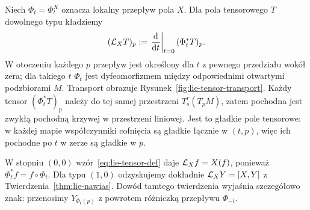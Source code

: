 \begin{definicja}
\label{def:lie-tensor}
Niech $\Phi_t=\Phi_t^X$ oznacza lokalny przepływ pola $X$.
Dla pola tensorowego $T$ dowolnego typu kładziemy
\begin{equation}\label{eq:lie-tensor-def}
 (\mathcal L_XT)_p
 :=\left.\frac{\mathrm d}{\mathrm d t}\right|_{t=0}
 (\Phi_t^*T)_p.
\end{equation}
W otoczeniu każdego $p$ przepływ jest określony dla $t$
z pewnego przedziału wokół zera; dla takiego $t$
$\Phi_t$ jest dyfeomorfizmem między odpowiednimi otwartymi
podzbiorami $M$. Transport obrazuje
Rysunek~\ref{fig:lie-tensor-transport}.
Każdy tensor $(\Phi_t^*T)_p$ należy do tej samej
przestrzeni $T^r_s(T_pM)$, zatem pochodna jest
zwykłą pochodną krzywej w przestrzeni liniowej. Jest to gładkie
pole tensorowe: w każdej mapie współczynniki cofnięcia są gładkie
łącznie w $(t,p)$, więc ich pochodne po $t$ w zerze są gładkie w $p$.
\end{definicja}

W stopniu $(0,0)$ wzór~\eqref{eq:lie-tensor-def} daje
$\mathcal L_Xf=X(f)$, ponieważ $\Phi_t^*f=f\circ\Phi_t$.
Dla typu $(1,0)$ odzyskujemy dokładnie
$\mathcal L_XY=[X,Y]$ z Twierdzenia~\ref{thm:lie-nawias}.
Dowód tamtego twierdzenia wyjaśnia szczegółowo znak:
przenosimy $Y_{\Phi_t(p)}$ z powrotem różniczką
przepływu $\Phi_{-t}$.

